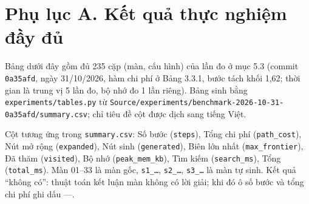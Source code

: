 \section{Phụ lục A. Kết quả thực nghiệm đầy đủ}

Bảng dưới đây gồm đủ 235 cặp (màn, cấu hình) của lần đo ở mục 5.3 (commit \texttt{0a35afd}, ngày 31/10/2026, hàm chi phí ở Bảng 3.3.1, bước tách khối 1,62; thời gian là trung vị 5 lần đo, bộ nhớ đo 1 lần riêng). Bảng sinh bằng \texttt{experiments/\allowbreak{}tables.\allowbreak{}py} từ \texttt{Source/\allowbreak{}experiments/\allowbreak{}benchmark-\allowbreak{}2026-\allowbreak{}10-\allowbreak{}31-\allowbreak{}0a35afd/\allowbreak{}summary.\allowbreak{}csv}; chỉ tiêu đề cột được dịch sang tiếng Việt.

Cột tương ứng trong \texttt{summary.\allowbreak{}csv}: Số bước (\texttt{steps}), Tổng chi phí (\texttt{path\_\allowbreak{}cost}), Nút mở rộng (\texttt{expanded}), Nút sinh (\texttt{generated}), Biên lớn nhất (\texttt{max\_\allowbreak{}frontier}), Đã thăm (\texttt{visited}), Bộ nhớ (\texttt{peak\_\allowbreak{}mem\_\allowbreak{}kb}), Tìm kiếm (\texttt{search\_\allowbreak{}ms}), Tổng (\texttt{total\_\allowbreak{}ms}). Màn 01--33 là màn gốc, \texttt{s1\_\allowbreak{}…}, \texttt{s2\_\allowbreak{}…}, \texttt{s3\_\allowbreak{}…} là màn tự sinh. Kết quả ``không có'': thuật toán kết luận màn không có lời giải; khi đó ô số bước và tổng chi phí ghi dấu ---.

